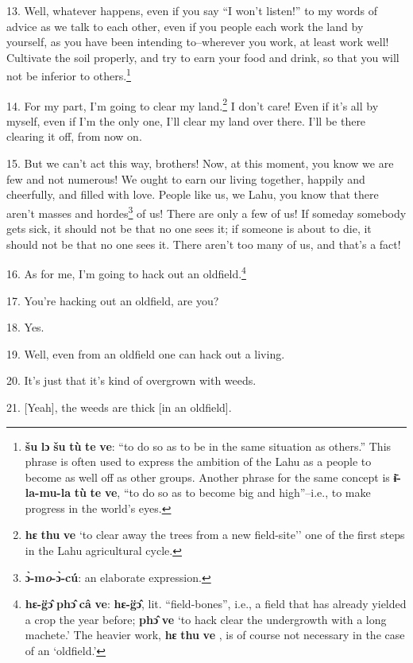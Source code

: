 13. Well, whatever happens, even if you say ``I won't listen!''
to my words of advice as we talk to each other, even if you people each work the
land by yourself, as you have been intending to--wherever you work, at least work
well! Cultivate the soil properly, and try to earn your food and drink, so that
you will not be inferior to others.\footnote{\textbf{šu} \textbf{lɔ} \textbf{šu} \textbf{tù} \textbf{te} \textbf{ve}: ``to do so as to be in the same situation as others.'' This phrase is often used to express the ambition of the Lahu as a people to become as well off as other groups. Another phrase for the same concept is \textbf{ɨ̄-la-mu-la} \textbf{tù} \textbf{te} \textbf{ve}, ``to do so as to become big and high''--i.e., to make progress in the world's eyes.}

14. For my part, I'm going to clear my land.\footnote{\textbf{hɛ} \textbf{thu} \textbf{ve} `to clear away the trees from a new field-site'' one of the first steps in the Lahu agricultural cycle.} I don't care! Even if it's all
by myself, even if I'm the only one, I'll clear my land over there. I'll be there
clearing it off, from now on.

15. But we can't act this way, brothers! Now, at this moment, you know we are few
and not numerous! We ought to earn our living together, happily and cheerfully,
and filled with love. People like us, we Lahu, you know that there aren't masses
and hordes\footnote{\textbf{ɔ̀-m\textit{\emph{o}}-ɔ̀-cú}: an elaborate expression.} of us! There are only a few of us! If someday somebody gets sick,
it should not be that no one sees it; if someone is about to die, it should not
be that no one sees it. There aren't too many of us, and that's a fact!

16. As for me, I'm going to hack out an oldfield.\footnote{\textbf{hɛ-g̈ɔ̂} \textbf{phɔ̂} \textbf{câ} \textbf{ve}: \textbf{hɛ-g̈ɔ̂}, lit. ``field-bones'', i.e., a field that has already yielded a crop the year before; \textbf{phɔ̂} \textbf{ve} `to hack clear the undergrowth with a long machete.' The heavier work, \textbf{hɛ} \textbf{thu} \textbf{ve} , is of course not necessary in the case of an `oldfield.'}

17. You're hacking out an oldfield, are you?

18. Yes.

19. Well, even from an oldfield one can hack out a living.

20. It's just that it's kind of overgrown with weeds.

21. [Yeah], the weeds are thick [in an oldfield].

